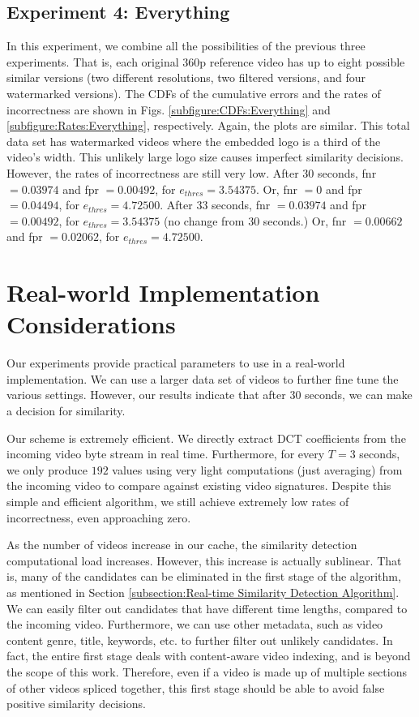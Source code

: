 \documentclass{article}
\begin{document}
\subsection{Experiment 4: Everything}
In this experiment, we combine all the possibilities of the previous three experiments. That is, each original $360$p reference video has up to eight possible similar versions (two different resolutions, two filtered versions, and four watermarked versions). The CDFs of the cumulative errors and the rates of incorrectness are shown in Figs. \ref{subfigure:CDFs:Everything} and \ref{subfigure:Rates:Everything}, respectively. Again, the plots are similar. This total data set has watermarked videos where the embedded logo is a third of the video's width. This unlikely large logo size causes imperfect similarity decisions. However, the rates of incorrectness are still very low. After $30$ seconds, fnr $= 0.03974$ and fpr $=0.00492$, for $e_{thres} = 3.54375$. Or, fnr $= 0$ and fpr $= 0.04494$, for $e_{thres} = 4.72500$. After $33$ seconds, fnr $= 0.03974$ and fpr $=0.00492$, for $e_{thres} = 3.54375$ (no change from $30$ seconds.) Or, fnr $= 0.00662$ and fpr $=0.02062$, for $e_{thres} = 4.72500$.


\section{Real-world Implementation Considerations}
\label{section:Real-world Implementation Considerations}
Our experiments provide practical parameters to use in a real-world implementation. We can use a larger data set of videos to further fine tune the various settings. However, our results indicate that after $30$ seconds, we can make a decision for similarity.

Our scheme is extremely efficient. We directly extract DCT coefficients from the incoming video byte stream in real time. Furthermore, for every $T = 3$ seconds, we only produce $192$ values using very light computations (just averaging) from the incoming video to compare against existing video signatures. Despite this simple and efficient algorithm, we still achieve extremely low rates of incorrectness, even approaching zero.

As the number of videos increase in our cache, the similarity detection computational load increases. However, this increase is actually sublinear. That is, many of the candidates can be eliminated in the first stage of the algorithm, as mentioned in Section \ref{subsection:Real-time Similarity Detection Algorithm}. We can easily filter out candidates that have different time lengths, compared to the incoming video. Furthermore, we can use other metadata, such as video content genre, title, keywords, etc. to further filter out unlikely candidates. In fact, the entire first stage deals with content-aware video indexing, and is beyond the scope of this work. Therefore, even if a video is made up of multiple sections of other videos spliced together, this first stage should be able to avoid false positive similarity decisions.
\end{document}
